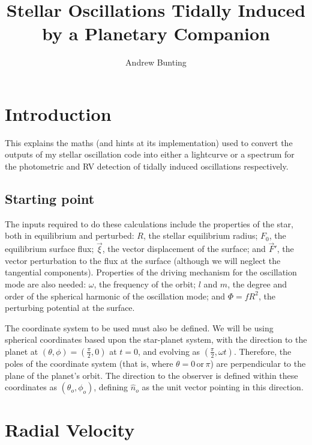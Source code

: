 \documentclass[11pt]{amsart}
\title{Stellar Oscillations Tidally Induced by a Planetary Companion}
\author{Andrew Bunting}
\begin{document}
\maketitle



\section{Introduction} \label{Introduction}

This explains the maths (and hints at its implementation) used to convert the outputs of my stellar oscillation code into either a lightcurve or a spectrum for the photometric and RV detection of tidally induced oscillations respectively.



\subsection{Starting point} \label{Intro:StartingPoint}

The inputs required to do these calculations include the properties of the star, both in equilibrium and perturbed: $R$, the stellar equilibrium radius; $F_{0}$, the equilibrium surface flux; $\vec{\xi}$, the vector displacement of the surface; and $\vec{F}'$, the vector perturbation to the flux at the surface (although we will neglect the tangential components).  Properties of the driving mechanism for the oscillation mode are also needed: $\omega$, the frequency of the orbit; $l$ and $m$, the degree and order of the spherical harmonic of the oscillation mode; and $\Phi =  f R^{2}$, the perturbing potential at the surface.

The coordinate system to be used must also be defined.  We will be using spherical coordinates based upon the star-planet system, with the direction to the planet at $(\theta, \phi) = (\frac{\pi}{2}, 0)$ at $t = 0$, and evolving as $(\frac{\pi}{2}, \omega t)$.  Therefore, the poles of the coordinate system (that is, where $\theta = 0 \, \text{or} \, \pi$) are perpendicular to the plane of the planet's orbit.  The direction to the observer is defined within these coordinates as $(\theta_{o}, \phi_{o})$, defining $\hat{n}_{o}$ as the unit vector pointing in this direction.





\section{Radial Velocity} \label{RV}
\end{document}
